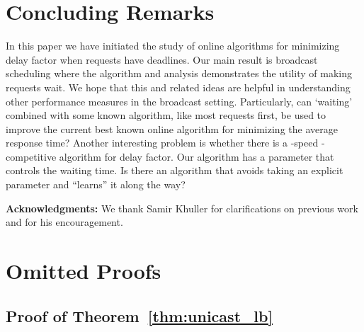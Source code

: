 \documentclass[11pt]{article}
\begin{document}
\section{Concluding Remarks}
In this paper we have initiated the study of online algorithms for
minimizing delay factor when requests have deadlines.  Our main result
is broadcast scheduling where the algorithm and analysis demonstrates
the utility of making requests wait. We hope that this and related
ideas are helpful in understanding other performance measures in the
broadcast setting. Particularly, can `waiting' combined with some
known algorithm, like most requests first, be used to improve the
current best known online algorithm for minimizing the average
response time? Another interesting problem is whether there is a
-speed -competitive algorithm for delay factor.  Our
algorithm has a parameter that controls the waiting time. Is there an
algorithm that avoids taking an explicit parameter and ``learns'' it
along the way?

\bigskip
\noindent
{\bf Acknowledgments:} We thank Samir Khuller for
clarifications on previous work and for his encouragement.





\appendix

\section{Omitted Proofs}

\subsection{Proof of Theorem~\ref{thm:unicast_lb}}
\end{document}
